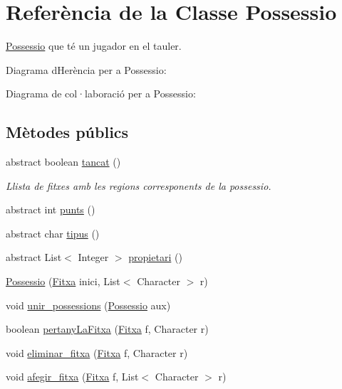 \hypertarget{class_possessio}{}\section{Referència de la Classe Possessio}
\label{class_possessio}


\mbox{\hyperlink{class_possessio}{Possessio}} que té un jugador en el tauler.  




Diagrama d\textquotesingle{}Herència per a Possessio\+:


Diagrama de col·laboració per a Possessio\+:
\subsection*{Mètodes públics}
\begin{DoxyCompactItemize}
\item 
abstract boolean \mbox{\hyperlink{class_possessio_aaf57a4c4c4eb208a7a636c94182023f2}{tancat}} ()
\begin{DoxyCompactList}\small\item\em Llista de fitxes amb les regions corresponents de la possessio. \end{DoxyCompactList}\item 
abstract int \mbox{\hyperlink{class_possessio_a8b774652b07b0b5eae3252cf0d7baba1}{punts}} ()
\item 
abstract char \mbox{\hyperlink{class_possessio_a3fa7231e1183f1be2882d4977c6a74a7}{tipus}} ()
\item 
abstract List$<$ Integer $>$ \mbox{\hyperlink{class_possessio_a514ceb05b8016e230eddbc7e3e43b325}{propietari}} ()
\item 
\mbox{\hyperlink{class_possessio_a192dc7a5276bc2d8f18b80c0061a5fe6}{Possessio}} (\mbox{\hyperlink{class_fitxa}{Fitxa}} inici, List$<$ Character $>$ r)
\item 
void \mbox{\hyperlink{class_possessio_ac733be14dd5608eef86b00a5bce3a13f}{unir\+\_\+possessions}} (\mbox{\hyperlink{class_possessio}{Possessio}} aux)
\item 
boolean \mbox{\hyperlink{class_possessio_a54bf2ddd9e6e2495b43d507df3902c17}{pertany\+La\+Fitxa}} (\mbox{\hyperlink{class_fitxa}{Fitxa}} f, Character r)
\item 
void \mbox{\hyperlink{class_possessio_a2d34d7e8539eeface62f627f568ee37d}{eliminar\+\_\+fitxa}} (\mbox{\hyperlink{class_fitxa}{Fitxa}} f, Character r)
\item 
void \mbox{\hyperlink{class_possessio_af662b46bc78afc70a7f874693d518612}{afegir\+\_\+fitxa}} (\mbox{\hyperlink{class_fitxa}{Fitxa}} f, List$<$ Character $>$ r)

\end{DoxyCompactItemize}
